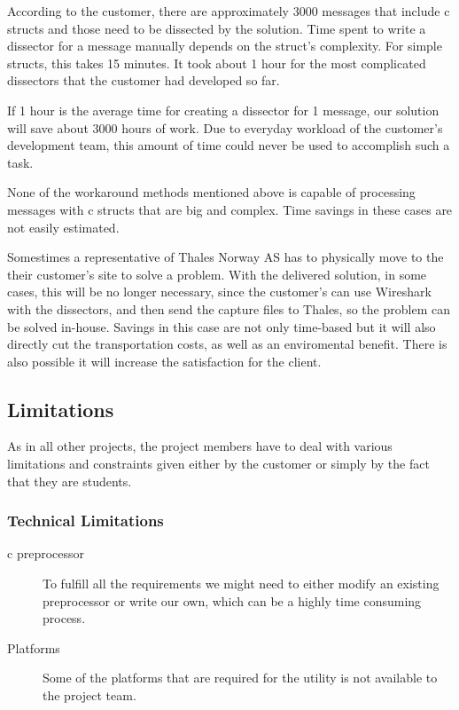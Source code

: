 According to the customer, there are approximately 3000 messages that include \Gls{c} \glspl{struct} and those need to be dissected by the solution. Time spent to write a \gls{dissector} for a message manually depends on the \gls{struct}’s complexity. For simple \glspl{struct}, this takes 15 minutes. It took about 1 hour for the most complicated \glspl{dissector} that the customer had developed so far.

If 1 hour is the average time for creating a \gls{dissector} for 1 message, our solution will save about 3000 hours of work. Due to everyday workload of the customer’s development team, this amount of time could never be used to accomplish such a task.

None of the workaround methods mentioned above is capable of processing messages with \Gls{c} \glspl{struct} that are big and complex. Time savings in these cases are not easily estimated.

Somestimes a representative of Thales Norway AS has to physically move to the their customer’s site to solve a problem. With the delivered solution, in some cases, this will be no longer necessary, since the customer's can use Wireshark with the dissectors, and then send the capture files to Thales, so the problem can be solved in-house. Savings in this case are not only time-based but it will also directly cut the transportation costs, as well as an enviromental benefit. There is also possible it will increase the satisfaction for the client.

\subsection{Limitations}
As in all other projects, the project members have to deal with various limitations and constraints given either by the customer or simply by the fact that they are students.

\subsubsection{Technical Limitations}
\begin{description}
	\item[\Gls{c} \gls{preprocessor}] To fulfill all the requirements we might need to
		either modify an existing \gls{preprocessor} or write our own, which can be
		a highly time consuming process.
	\item[Platforms] Some of the platforms that are required for the utility is not
		available to the project team.
\end{description}

